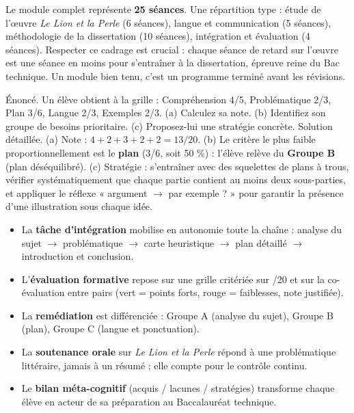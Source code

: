 \documentclass[11pt]{article}
\begin{document}
\begin{exemplebox}
Le module complet représente \textbf{25 séances}. Une répartition type : étude de l'œuvre \emph{Le Lion et la Perle} (6 séances), langue et communication (5 séances), méthodologie de la dissertation (10 séances), intégration et évaluation (4 séances). Respecter ce cadrage est crucial : chaque séance de retard sur l'œuvre est une séance en moins pour s'entraîner à la dissertation, épreuve reine du Bac technique. Un module bien tenu, c'est un programme terminé avant les révisions.
\end{exemplebox}

\begin{exoresolu}
Énoncé. Un élève obtient à la grille : Compréhension 4/5, Problématique 2/3, Plan 3/6, Langue 2/3, Exemples 2/3. (a) Calculez sa note. (b) Identifiez son groupe de besoins prioritaire. (c) Proposez-lui une stratégie concrète.
\tcblower
Solution détaillée.
(a) Note : $4 + 2 + 3 + 2 + 2 = 13/20$.
(b) Le critère le plus faible proportionnellement est le \textbf{plan} (3/6, soit 50 \%) : l'élève relève du \textbf{Groupe B} (plan déséquilibré).
(c) Stratégie : s'entraîner avec des squelettes de plans à trous, vérifier systématiquement que chaque partie contient au moins deux sous-parties, et appliquer le réflexe « argument $\rightarrow$ par exemple ? » pour garantir la présence d'une illustration sous chaque idée.
\end{exoresolu}

\begin{aretenir}
\begin{itemize}
\item La \textbf{tâche d'intégration} mobilise en autonomie toute la chaîne : analyse du sujet $\rightarrow$ problématique $\rightarrow$ carte heuristique $\rightarrow$ plan détaillé $\rightarrow$ introduction et conclusion.
\item L'\textbf{évaluation formative} repose sur une grille critériée sur /20 et sur la co-évaluation entre pairs (vert = points forts, rouge = faiblesses, note justifiée).
\item La \textbf{remédiation} est différenciée : Groupe A (analyse du sujet), Groupe B (plan), Groupe C (langue et ponctuation).
\item La \textbf{soutenance orale} sur \emph{Le Lion et la Perle} répond à une problématique littéraire, jamais à un résumé ; elle compte pour le contrôle continu.
\item Le \textbf{bilan méta-cognitif} (acquis / lacunes / stratégies) transforme chaque élève en acteur de sa préparation au Baccalauréat technique.
\end{itemize}
\end{aretenir}
\end{document}
